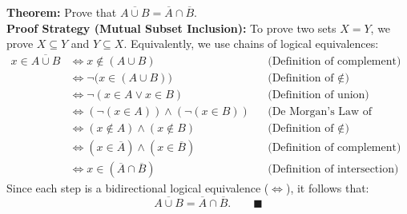 \documentclass[11pt,a4paper]{article}
\begin{document}
\begin{theorembox}
\textbf{Theorem:} Prove that $\overline{A \cup B} = \overline{A} \cap \overline{B}$.\\
\textbf{Proof Strategy (Mutual Subset Inclusion):} To prove two sets $X = Y$, we prove $X \subseteq Y$ and $Y \subseteq X$. Equivalently, we use chains of logical equivalences:
\begin{align*}
x \in \overline{A \cup B} &\iff x \notin (A \cup B) && \text{(Definition of complement)} \\
&\iff \neg \big(x \in (A \cup B)\big) && \text{(Definition of $\notin$)} \\
&\iff \neg (x \in A \lor x \in B) && \text{(Definition of union)} \\
&\iff (\neg (x \in A)) \land (\neg (x \in B)) && \text{(De Morgan's Law of Propositional Logic!)} \\
&\iff (x \notin A) \land (x \notin B) && \text{(Definition of $\notin$)} \\
&\iff (x \in \overline{A}) \land (x \in \overline{B}) && \text{(Definition of complement)} \\
&\iff x \in (\overline{A} \cap \overline{B}) && \text{(Definition of intersection)}
\end{align*}
Since each step is a bidirectional logical equivalence ($\iff$), it follows that:
\[
\overline{A \cup B} = \overline{A} \cap \overline{B}. \qquad \blacksquare
\]
\end{theorembox}
\end{document}
